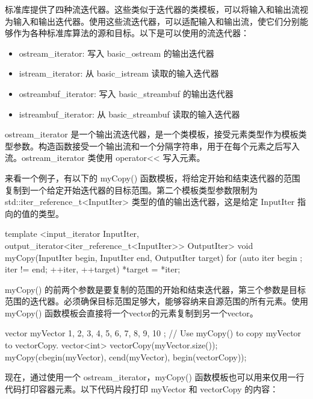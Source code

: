 
标准库提供了四种流迭代器。这些类似于迭代器的类模板，可以将输入和输出流视为输入和输出迭代器。使用这些流迭代器，可以适配输入和输出流，使它们分别能够作为各种标准库算法的源和目标。以下是可以使用的流迭代器：

\begin{itemize}
\item
ostream\_iterator: 写入 basic\_ostream 的输出迭代器

\item
istream\_iterator: 从 basic\_istream 读取的输入迭代器

\item
ostreambuf\_iterator: 写入 basic\_streambuf 的输出迭代器

\item
istreambuf\_iterator:  从 basic\_streambuf 读取的输入迭代器
\end{itemize}


ostream\_iterator 是一个输出流迭代器，是一个类模板，接受元素类型作为模板类型参数。构造函数接受一个输出流和一个分隔字符串，用于在每个元素之后写入流。ostream\_iterator 类使用 operator<{}< 写入元素。

来看一个例子，有以下的 myCopy() 函数模板，将给定开始和结束迭代器的范围复制到一个给定开始迭代器的目标范围。第二个模板类型参数限制为 std::iter\_reference\_t<InputIter> 类型的值的输出迭代器，这是给定 InputIter 指向的值的类型。

\begin{cpp}
template <input_iterator InputIter,
    output_iterator<iter_reference_t<InputIter>> OutputIter>
void myCopy(InputIter begin, InputIter end, OutputIter target)
{
    for (auto iter { begin }; iter != end; ++iter, ++target) { *target = *iter; }
}
\end{cpp}

myCopy() 的前两个参数是要复制的范围的开始和结束迭代器，第三个参数是目标范围的迭代器。必须确保目标范围足够大，能够容纳来自源范围的所有元素。使用 myCopy() 函数模板会直接将一个vector的元素复制到另一个vector。

\begin{cpp}
vector myVector { 1, 2, 3, 4, 5, 6, 7, 8, 9, 10 };
// Use myCopy() to copy myVector to vectorCopy.
vector<int> vectorCopy(myVector.size());
myCopy(cbegin(myVector), cend(myVector), begin(vectorCopy));
\end{cpp}

现在，通过使用一个 ostream\_iterator，myCopy() 函数模板也可以用来仅用一行代码打印容器元素。以下代码片段打印 myVector 和 vectorCopy 的内容：

